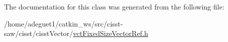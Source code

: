 The documentation for this class was generated from the following file\-:\begin{DoxyCompactItemize}
\item 
/home/adeguet1/catkin\-\_\-ws/src/cisst-\/saw/cisst/cisst\-Vector/\hyperlink{vct_fixed_size_vector_ref_8h}{vct\-Fixed\-Size\-Vector\-Ref.\-h}\end{DoxyCompactItemize}
